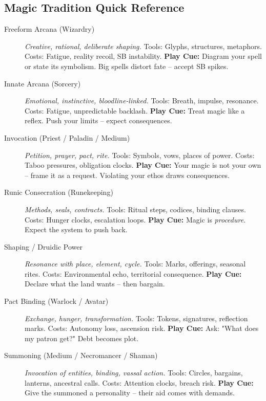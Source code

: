 \subsection{Magic Tradition Quick Reference}

\begin{description}
  \item[Freeform Arcana (Wizardry)] \textit{Creative, rational, deliberate shaping.} Tools: Glyphs, structures, metaphors. Costs: Fatigue, reality recoil, SB instability. \textbf{Play Cue:} Diagram your spell or state its symbolism. Big spells distort fate -- accept SB spikes.
  
  \item[Innate Arcana (Sorcery)] \textit{Emotional, instinctive, bloodline‑linked.} Tools: Breath, impulse, resonance. Costs: Fatigue, unpredictable backlash. \textbf{Play Cue:} Treat magic like a reflex. Push your limits -- expect consequences.
  
  \item[Invocation (Priest / Paladin / Medium)] \textit{Petition, prayer, pact, rite.} Tools: Symbols, vows, places of power. Costs: Taboo pressures, obligation clocks. \textbf{Play Cue:} Your magic is not your own -- frame it as a request. Violating your ethos draws consequences.
  
  \item[Runic Consecration (Runekeeping)] \textit{Methods, seals, contracts.} Tools: Ritual steps, codices, binding clauses. Costs: Hunger clocks, escalation loops. \textbf{Play Cue:} Magic is \emph{procedure}. Expect the system to push back.
  
  \item[Shaping / Druidic Power] \textit{Resonance with place, element, cycle.} Tools: Marks, offerings, seasonal rites. Costs: Environmental echo, territorial consequence. \textbf{Play Cue:} Declare what the land wants -- then bargain.
  
  \item[Pact Binding (Warlock / Avatar)] \textit{Exchange, hunger, transformation.} Tools: Tokens, signatures, reflection marks. Costs: Autonomy loss, ascension risk. \textbf{Play Cue:} Ask: "What does my patron get?" Debt becomes plot.
  
  \item[Summoning (Medium / Necromancer / Shaman)] \textit{Invocation of entities, binding, vassal action.} Tools: Circles, bargains, lanterns, ancestral calls. Costs: Attention clocks, breach risk. \textbf{Play Cue:} Give the summoned a personality -- their aid comes with demands.
\end{description}

